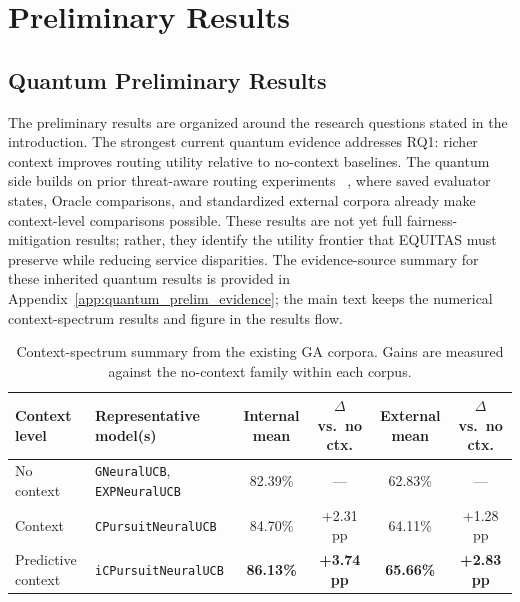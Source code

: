 \documentclass[conference]{IEEEtran}
\begin{document}
\section{Preliminary Results}
\subsection{Quantum Preliminary Results}
The preliminary results are organized around the research questions stated in
the introduction. The strongest current quantum evidence addresses RQ1: richer
context improves routing utility relative to no-context baselines. The quantum
side builds on prior threat-aware routing experiments
~\cite{garcia2026threat_aware_quantum_routing}, where saved evaluator states,
Oracle comparisons, and standardized external corpora already make
context-level comparisons possible. These results are not yet full
fairness-mitigation results; rather, they identify the utility frontier that
EQUITAS must preserve while reducing service disparities. The evidence-source
summary for these inherited quantum results is provided in
Appendix~\ref{app:quantum_prelim_evidence}; the main text keeps the numerical
context-spectrum results and figure in the results flow.

\begin{table}[t]
\caption{Context-spectrum summary from the existing GA corpora. Gains are measured
against the no-context family within each corpus.}
\label{tab:context_spectrum}
\centering
\small
\setlength{\tabcolsep}{5pt}
\begin{tabular}{p{}p{}cccc}
\toprule
\textbf{Context level} & \textbf{Representative model(s)} & \textbf{Internal mean} & \textbf{$\Delta$ vs.\ no ctx.} & \textbf{External mean} & \textbf{$\Delta$ vs.\ no ctx.} \\
\midrule
No context & \texttt{GNeuralUCB}, \texttt{EXPNeuralUCB} & 82.39\% & --- & 62.83\% & --- \\
Context & \texttt{CPursuitNeuralUCB} & 84.70\% & +2.31 pp & 64.11\% & +1.28 pp \\
Predictive context & \texttt{iCPursuitNeuralUCB} & \textbf{86.13\%} & \textbf{+3.74 pp} & \textbf{65.66\%} & \textbf{+2.83 pp} \\
\bottomrule
\end{tabular}
\end{table}
\end{document}
